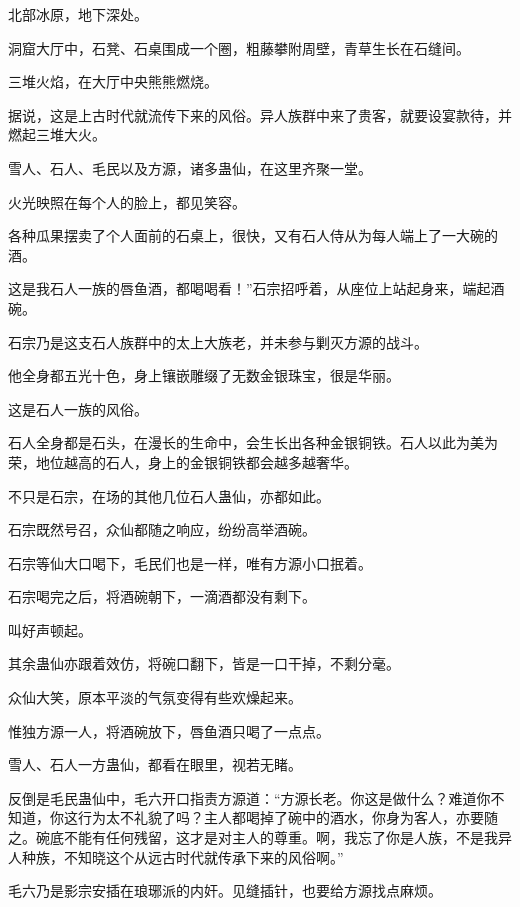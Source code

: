 
\begin{this_body}



北部冰原，地下深处。

洞窟大厅中，石凳、石桌围成一个圈，粗藤攀附周壁，青草生长在石缝间。

三堆火焰，在大厅中央熊熊燃烧。

据说，这是上古时代就流传下来的风俗。异人族群中来了贵客，就要设宴款待，并燃起三堆大火。

雪人、石人、毛民以及方源，诸多蛊仙，在这里齐聚一堂。

火光映照在每个人的脸上，都见笑容。

各种瓜果摆卖了个人面前的石桌上，很快，又有石人侍从为每人端上了一大碗的酒。

这是我石人一族的唇鱼酒，都喝喝看！”石宗招呼着，从座位上站起身来，端起酒碗。

石宗乃是这支石人族群中的太上大族老，并未参与剿灭方源的战斗。

他全身都五光十色，身上镶嵌雕缀了无数金银珠宝，很是华丽。

这是石人一族的风俗。

石人全身都是石头，在漫长的生命中，会生长出各种金银铜铁。石人以此为美为荣，地位越高的石人，身上的金银铜铁都会越多越奢华。

不只是石宗，在场的其他几位石人蛊仙，亦都如此。

石宗既然号召，众仙都随之响应，纷纷高举酒碗。

石宗等仙大口喝下，毛民们也是一样，唯有方源小口抿着。

石宗喝完之后，将酒碗朝下，一滴酒都没有剩下。

叫好声顿起。

其余蛊仙亦跟着效仿，将碗口翻下，皆是一口干掉，不剩分毫。

众仙大笑，原本平淡的气氛变得有些欢燥起来。

惟独方源一人，将酒碗放下，唇鱼酒只喝了一点点。

雪人、石人一方蛊仙，都看在眼里，视若无睹。

反倒是毛民蛊仙中，毛六开口指责方源道：“方源长老。你这是做什么？难道你不知道，你这行为太不礼貌了吗？主人都喝掉了碗中的酒水，你身为客人，亦要随之。碗底不能有任何残留，这才是对主人的尊重。啊，我忘了你是人族，不是我异人种族，不知晓这个从远古时代就传承下来的风俗啊。”

毛六乃是影宗安插在琅琊派的内奸。见缝插针，也要给方源找点麻烦。


\end{this_body}
